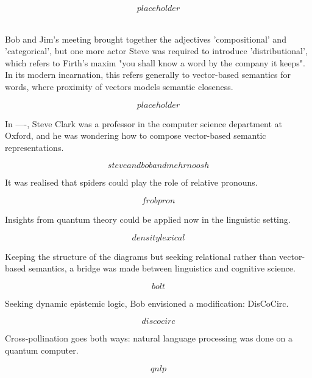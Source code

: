 \begin{fullwidth}
\[placeholder\]

\\

Bob and Jim's meeting brought together the adjectives 'compositional' and 'categorical', but one more actor Steve was required to introduce 'distributional', which refers to Firth's maxim \citep{} "you shall know a word by the company it keeps". In its modern incarnation, this refers generally to vector-based semantics for words, where proximity of vectors models semantic closeness.

\[placeholder\]

In ----, Steve Clark was a professor in the computer science department at Oxford, and he was wondering how to compose vector-based semantic representations.

\[steve and bob and mehrnoosh\]

It was realised that spiders could play the role of relative pronouns.

\[frobpron\]

Insights from quantum theory could be applied now in the linguistic setting.

\[density lexical\]

Keeping the structure of the diagrams but seeking relational rather than vector-based semantics, a bridge was made between linguistics and cognitive science.

\[bolt\]

Seeking dynamic epistemic logic, Bob envisioned a modification: DisCoCirc.

\[discocirc\]

Cross-pollination goes both ways: natural language processing was done on a quantum computer.

\[qnlp\]



\end{fullwidth}
